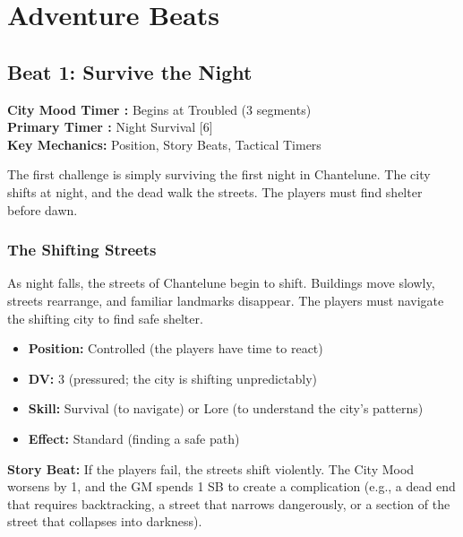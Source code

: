 \documentclass{article}
\begin{document}
\section{Adventure Beats}

\subsection{Beat 1: Survive the Night}

\begin{mechanicbox}
\textbf{City Mood Timer :} Begins at Troubled (3 segments) \\
\textbf{Primary Timer :} Night Survival [6] \\
\textbf{Key Mechanics:} Position, Story Beats, Tactical Timers
\end{mechanicbox}

The first challenge is simply surviving the first night in Chantelune. The city shifts at night, and the dead walk the streets. The players must find shelter before dawn.

\subsubsection{The Shifting Streets}

As night falls, the streets of Chantelune begin to shift. Buildings move slowly, streets rearrange, and familiar landmarks disappear. The players must navigate the shifting city to find safe shelter.

\begin{itemize}
    \item \textbf{Position:} Controlled (the players have time to react)
    \item \textbf{DV:} 3 (pressured; the city is shifting unpredictably)
    \item \textbf{Skill:} Survival (to navigate) or Lore (to understand the city's patterns)
    \item \textbf{Effect:} Standard (finding a safe path)
\end{itemize}

\begin{storybox}
\textbf{Story Beat:} If the players fail, the streets shift violently. The City Mood worsens by 1, and the GM spends 1 SB to create a complication (e.g., a dead end that requires backtracking, a street that narrows dangerously, or a section of the street that collapses into darkness).
\end{storybox}
\end{document}
